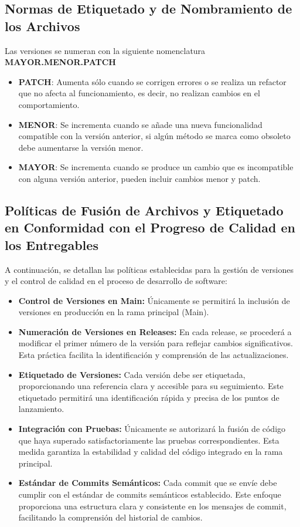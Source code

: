 \subsection{Normas de Etiquetado y de Nombramiento de los Archivos}

Las versiones se numeran con la siguiente nomenclatura \textbf{MAYOR.MENOR.PATCH}
\begin{itemize}
    \item \textbf{PATCH}: Aumenta sólo cuando se corrigen errores o se realiza un refactor que no afecta al funcionamiento, es decir, no realizan cambios en el comportamiento.
    \item \textbf{MENOR}: Se incrementa cuando se añade una nueva funcionalidad compatible con la versión anterior, si algún método se marca como obsoleto debe aumentarse la versión menor.
    \item \textbf{MAYOR}: Se incrementa cuando se produce un cambio que es incompatible con alguna versión anterior, pueden incluir cambios menor y patch.
\end{itemize}


\subsection{Políticas de Fusión de Archivos y Etiquetado en Conformidad con el Progreso de Calidad en los Entregables}

A continuación, se detallan las políticas establecidas para la gestión de versiones y el control de calidad en el proceso de desarrollo de software:

\begin{itemize}
\item \textbf{Control de Versiones en Main:} Únicamente se permitirá la inclusión de versiones en producción en la rama principal (Main).

\item \textbf{Numeración de Versiones en Releases:} En cada release, se procederá a modificar el primer número de la versión para reflejar cambios significativos. Esta práctica facilita la identificación y comprensión de las actualizaciones.

\item \textbf{Etiquetado de Versiones:} Cada versión debe ser etiquetada, proporcionando una referencia clara y accesible para su seguimiento. Este etiquetado permitirá una identificación rápida y precisa de los puntos de lanzamiento.

\item \textbf{Integración con Pruebas:} Únicamente se autorizará la fusión de código que haya superado satisfactoriamente las pruebas correspondientes. Esta medida garantiza la estabilidad y calidad del código integrado en la rama principal.

\item \textbf{Estándar de Commits Semánticos:} Cada commit que se envíe debe cumplir con el estándar de commits semánticos establecido. Este enfoque proporciona una estructura clara y consistente en los mensajes de commit, facilitando la comprensión del historial de cambios.

\end{itemize}


